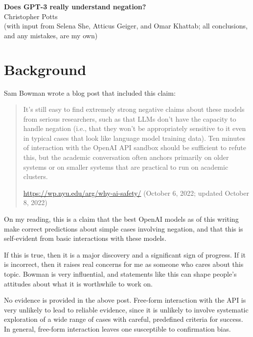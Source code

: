 \documentclass[11pt]{article}
\begin{document}
\pagestyle{fancy}
\lhead{}
\rhead{}
\lfoot{}
\cfoot{\thepage}
\rfoot{}
\renewcommand{\headrulewidth}{0pt}

\begin{center}
  {\Large\textbf{Does GPT-3 really understand negation?}} \\[1ex]
  Christopher Potts \\
  (with input from Selena She, Atticus Geiger, and
  Omar Khattab; all conclusions, and any mistakes, are my own)

\end{center}


\section{Background}

Sam Bowman wrote a blog post that included this claim:
%
\begin{quote}
  It's still easy to find extremely strong negative claims about these
  models from serious researchers, such as that LLMs don't have the
  capacity to handle negation (i.e., that they won’t be appropriately
  sensitive to it even in typical cases that look like language model
  training data). Ten minutes of interaction with the OpenAI API
  sandbox should be sufficient to refute this, but the academic
  conversation often anchors primarily on older systems or on smaller
  systems that are practical to run on academic clusters.

  \url{https://wp.nyu.edu/arg/why-ai-safety/} (October 6, 2022;
  updated October 8, 2022)
\end{quote}
%
On my reading, this is a claim that the best OpenAI models as of this
writing make correct predictions about simple cases involving
negation, and that this is self-evident from basic interactions with
these models.

If this is true, then it is a major discovery and a significant sign
of progress. If it is incorrect, then it raises real concerns for me
as someone who cares about this topic. Bowman is very influential, and
statements like this can shape people's attitudes about what it is
worthwhile to work on.

No evidence is provided in the above post. Free-form interaction with
the API is very unlikely to lead to reliable evidence, since it is
unlikely to involve systematic exploration of a wide range of cases
with careful, predefined criteria for success. In general, free-form
interaction leaves one susceptible to confirmation bias.
\end{document}
